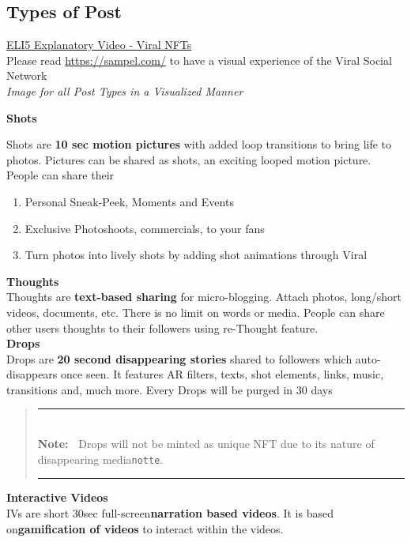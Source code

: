 \documentclass[10pt]{article}
\newlength{\Lnote}
\newcommand{\notte}[1]
     {\addtolength{\leftmargini}{1em}
        \settowidth{\Lnote}{\textbf{Note:~}}
        \begin{quote}
            \rule{\dimexpr\textwidth-2\leftmargini}{1pt}\\
                        \mbox{}\hspace{-\Lnote}\textbf{Note:~}%
                                            #1\\[-0.5ex] 
            \rule{\dimexpr\textwidth-2\leftmargini}{1pt}
        \end{quote}
        \addtolength{\leftmargini}{-4em}}
\begin{document}
\subsection{Types of Post}
\hyperlink{https://sample.com}{ELI5 Explanatory Video - Viral NFTs}\\

Please read \hyperlink{App Brouchure}{https://sampel.com/} to have a visual experience of the Viral Social Network\\

\textit{Image for all Post Types in a Visualized Manner}

\textbf{Shots}

Shots are \textbf{10 sec motion pictures} with added loop transitions to bring life to photos. Pictures can be shared as shots, an exciting looped motion picture.\\

People can share their
\begin{enumerate}[leftmargin=+0.2in]
\item Personal Sneak-Peek, Moments and Events
\item Exclusive Photoshoots, commercials, to your fans
\item Turn photos into lively shots by adding shot animations through Viral
\end{enumerate}

\textbf{Thoughts}\\
Thoughts are \textbf{text-based sharing} for micro-blogging. Attach photos, long/short videos, documents, etc. There is no limit on words or media. People can share other users thoughts to their followers using re-Thought feature.\\


\textbf{Drops}\\

Drops are \textbf{20 second disappearing stories} shared to followers which auto-disappears once seen. It features AR filters, texts, shot elements, links, music, transitions and, much more. Every Drops will be purged in 30 days\\

\notte{Drops will not be minted as unique NFT due to it\textsc{\char13}s nature of disappearing media\texttt{notte}.}

\textbf{Interactive Videos}\\

IVs are short 30sec full-screen\textbf{narration based videos}. It is based on\textbf{gamification of videos} to interact within the videos.\\
\end{document}
